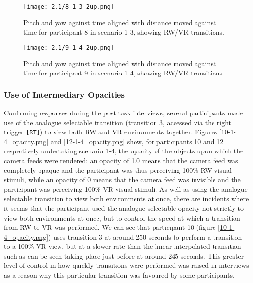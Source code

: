 \begin{figure}[h]
	\begin{center}
	\texttt{[image: 2.1/8-1-3\_2up.png]}
	\caption{Pitch and yaw against time aligned with distance moved against time for participant 8 in scenario 1-3, showing RW/VR transitions.}
	\label{8-1-3_2up.png}
	\end{center}
\end{figure}

\begin{figure}[h]
	\begin{center}
	\texttt{[image: 2.1/9-1-4\_2up.png]}
	\caption{Pitch and yaw against time aligned with distance moved against time for participant 9 in scenario 1-4, showing RW/VR transitions.}
	\label{9-1-4_2up.png}
	\end{center}
\end{figure}


\subsubsection{Use of Intermediary Opacities}

Confirming responses during the post task interviews, several participants made use of the analogue selectable transition (transition 3, accessed via the right trigger \texttt{[RT]}) to view both RW and VR environments together. Figures \ref{10-1-4_opacity.png} and \ref{12-1-4_opacity.png} show, for participants 10 and 12 respectively undertaking scenario 1-4, the opacity of the objects upon which the camera feeds were rendered: an opacity of 1.0 means that the camera feed was completely opaque and the participant was thus perceiving 100\% RW visual stimuli, while an opacity of 0 means that the camera feed was invisible and the participant was perceiving 100\% VR visual stimuli. As well as using the analogue selectable transition to view both environments at once, there are incidents where it seems that the participant used the analogue selectable opacity not strictly to view both environments at once, but to control the speed at which a transition from RW to VR was performed. We can see that participant 10 (figure \ref{10-1-4_opacity.png}) uses transition 3 at around 250 seconds to perform a transition to a 100\% VR view, but at a slower rate than the linear interpolated transition such as can be seen taking place just before at around 245 seconds. This greater level of control in how quickly transitions were performed was raised in interviews as a reason why this particular transition was favoured by some participants.

